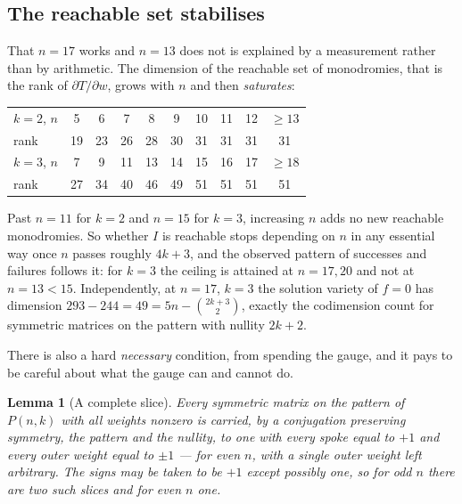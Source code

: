 \documentclass[11pt]{article}
\newtheorem{lemma}[theorem]{Lemma}
\theoremstyle{definition}
\begin{document}
\subsection*{The reachable set stabilises}
That $n=17$ works and $n=13$ does not is explained by a measurement rather than
by arithmetic. The dimension of the reachable set of monodromies, that is the
rank of $\partial T/\partial w$, grows with $n$ and then \emph{saturates}:
\begin{center}\small
\begin{tabular}{lccccccccc}
\toprule
$k=2$, $n$ & 5 & 6 & 7 & 8 & 9 & 10 & 11 & 12 & $\ge13$\\
rank & 19 & 23 & 26 & 28 & 30 & 31 & 31 & 31 & 31\\
\midrule
$k=3$, $n$ & 7 & 9 & 11 & 13 & 14 & 15 & 16 & 17 & $\ge18$\\
rank & 27 & 34 & 40 & 46 & 49 & 51 & 51 & 51 & 51\\
\bottomrule
\end{tabular}
\end{center}
Past $n=11$ for $k=2$ and $n=15$ for $k=3$, increasing $n$ adds no new reachable
monodromies. So whether $I$ is reachable stops depending on $n$ in any essential
way once $n$ passes roughly $4k+3$, and the observed pattern of successes and
failures follows it: for $k=3$ the ceiling is attained at $n=17,20$ and not at
$n=13<15$. Independently, at $n=17$, $k=3$ the solution variety of $f=0$ has
dimension $293-244=49=5n-\binom{2k+3}2$, exactly the codimension count for
symmetric matrices on the pattern with nullity $2k+2$.

There is also a hard \emph{necessary} condition, from spending the gauge, and it
pays to be careful about what the gauge can and cannot do.

\begin{lemma}[A complete slice]\label{lem:slice}
Every symmetric matrix on the pattern of $P(n,k)$ with all weights nonzero is
carried, by a conjugation preserving symmetry, the pattern and the nullity, to
one with every spoke equal to $+1$ and every outer weight equal to $\pm1$ --- for
even $n$, with a single outer weight left arbitrary. The signs may be taken to
be $+1$ except possibly one, so for odd $n$ there are two such slices and for
even $n$ one.
\end{lemma}
\end{document}
